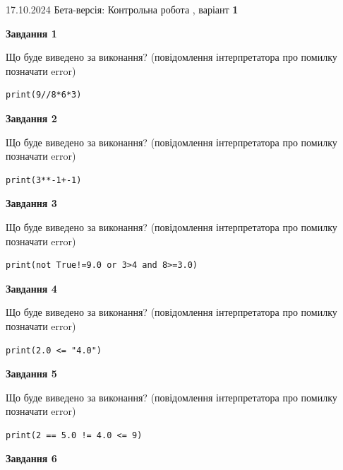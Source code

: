 \documentclass[12pt, ukrainian]{article}
\begin{document}
{\Large{17.10.2024 Бета-версія: Контрольна робота , варіант  \No \textbf { 1 }\par}}
{
\begin {large}
{\begin {center}\textbf{Завдання 1}\end {center}}

Що буде виведено за виконання? (повідомлення інтерпретатора про помилку позначати error)\par
\begin{verbatim}
print(9//8*6*3)
\end{verbatim}

{\begin {center}\textbf{Завдання 2}\end {center}}

Що буде виведено за виконання? (повідомлення інтерпретатора про помилку позначати error)\par
\begin{verbatim}
print(3**-1+-1)
\end{verbatim}

{\begin {center}\textbf{Завдання 3}\end {center}}

Що буде виведено за виконання? (повідомлення інтерпретатора про помилку позначати error)\par
\begin{verbatim}
print(not True!=9.0 or 3>4 and 8>=3.0)
\end{verbatim}

{\begin {center}\textbf{Завдання 4}\end {center}}

Що буде виведено за виконання? (повідомлення інтерпретатора про помилку позначати error)\par
\begin{verbatim}
print(2.0 <= "4.0")
\end{verbatim}

{\begin {center}\textbf{Завдання 5}\end {center}}

Що буде виведено за виконання? (повідомлення інтерпретатора про помилку позначати error)\par
\begin{verbatim}
print(2 == 5.0 != 4.0 <= 9)
\end{verbatim}

{\begin {center}\textbf{Завдання 6}\end {center}}


\end{large}}
\end{document}
